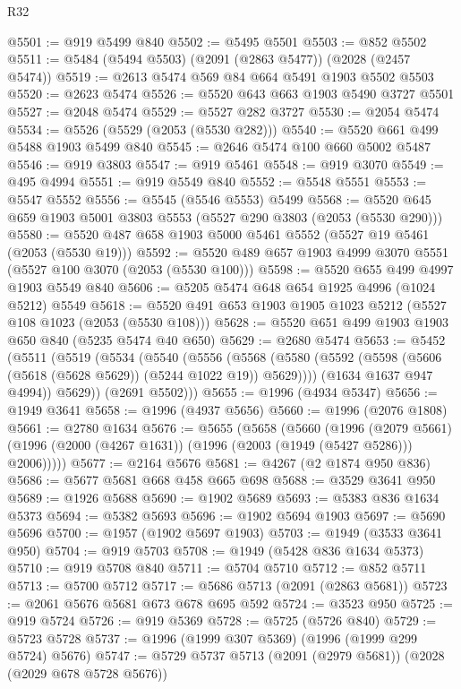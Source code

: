 \begin{lexlean}{R32}
\begin{coremodule}
@5501 := @919 @5499 @840
@5502 := @5495 @5501
@5503 := @852 @5502
@5511 := @5484 (@5494 @5503) (@2091 (@2863 @5477)) (@2028 (@2457 @5474))
@5519 := @2613 @5474 @569 @84 @664 @5491 @1903 @5502 @5503
@5520 := @2623 @5474
@5526 := @5520 @643 @663 @1903 @5490 @3727 @5501
@5527 := @2048 @5474
@5529 := @5527 @282 @3727
@5530 := @2054 @5474
@5534 := @5526 (@5529 (@2053 (@5530 @282)))
@5540 := @5520 @661 @499 @5488 @1903 @5499 @840
@5545 := @2646 @5474 @100 @660 @5002 @5487
@5546 := @919 @3803
@5547 := @919 @5461
@5548 := @919 @3070
@5549 := @495 @4994
@5551 := @919 @5549 @840
@5552 := @5548 @5551
@5553 := @5547 @5552
@5556 := @5545 (@5546 @5553) @5499
@5568 := @5520 @645 @659 @1903 @5001 @3803 @5553 (@5527 @290 @3803 (@2053 (@5530 @290)))
@5580 := @5520 @487 @658 @1903 @5000 @5461 @5552 (@5527 @19 @5461 (@2053 (@5530 @19)))
@5592 := @5520 @489 @657 @1903 @4999 @3070 @5551 (@5527 @100 @3070 (@2053 (@5530 @100)))
@5598 := @5520 @655 @499 @4997 @1903 @5549 @840
@5606 := @5205 @5474 @648 @654 @1925 @4996 (@1024 @5212) @5549
@5618 := @5520 @491 @653 @1903 @1905 @1023 @5212 (@5527 @108 @1023 (@2053 (@5530 @108)))
@5628 := @5520 @651 @499 @1903 @1903 @650 @840 (@5235 @5474 @40 @650)
@5629 := @2680 @5474
@5653 := @5452
    (@5511
      (@5519
        (@5534
          (@5540
            (@5556
              (@5568 (@5580 (@5592 (@5598 (@5606 (@5618 (@5628 @5629)) (@5244 @1022 @19)) @5629))))
              (@1634 @1637 @947 @4994))
            @5629))
        (@2691 @5502)))
@5655 := @1996 (@4934 @5347)
@5656 := @1949 @3641
@5658 := @1996 (@4937 @5656)
@5660 := @1996 (@2076 @1808)
@5661 := @2780 @1634
@5676 := @5655
    (@5658
      (@5660
        (@1996
          (@2079 @5661)
          (@1996 (@2000 (@4267 @1631)) (@1996 (@2003 (@1949 (@5427 @5286))) @2006)))))
@5677 := @2164 @5676
@5681 := @4267 (@2 @1874 @950 @836)
@5686 := @5677 @5681 @668 @458 @665 @698
@5688 := @3529 @3641 @950
@5689 := @1926 @5688
@5690 := @1902 @5689
@5693 := @5383 @836 @1634 @5373
@5694 := @5382 @5693
@5696 := @1902 @5694 @1903
@5697 := @5690 @5696
@5700 := @1957 (@1902 @5697 @1903)
@5703 := @1949 (@3533 @3641 @950)
@5704 := @919 @5703
@5708 := @1949 (@5428 @836 @1634 @5373)
@5710 := @919 @5708 @840
@5711 := @5704 @5710
@5712 := @852 @5711
@5713 := @5700 @5712
@5717 := @5686 @5713 (@2091 (@2863 @5681))
@5723 := @2061 @5676 @5681 @673 @678 @695 @592
@5724 := @3523 @950
@5725 := @919 @5724
@5726 := @919 @5369
@5728 := @5725 (@5726 @840)
@5729 := @5723 @5728
@5737 := @1996 (@1999 @307 @5369) (@1996 (@1999 @299 @5724) @5676)
@5747 := @5729 @5737 @5713 (@2091 (@2979 @5681)) (@2028 (@2029 @678 @5728 @5676))

\end{coremodule}
\end{lexlean}
